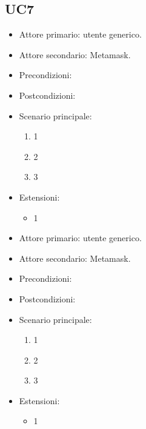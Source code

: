 \subsection{UC7}

\begin{itemize}
    \item Attore primario: utente generico.
    \item Attore secondario: Metamask.
    \item Precondizioni: 
    \item Postcondizioni: 
    \item Scenario principale: \begin{enumerate}
        \item 1
        \item 2
        \item 3
    \end{enumerate}
    \item Estensioni: \begin{itemize}
        \item 1
        \end{itemize}
\end{itemize}

\begin{itemize}
    \item Attore primario: utente generico.
    \item Attore secondario: Metamask.
    \item Precondizioni: 
    \item Postcondizioni: 
    \item Scenario principale: \begin{enumerate}
        \item 1
        \item 2
        \item 3
    \end{enumerate}
    \item Estensioni: \begin{itemize}
        \item 1
        \end{itemize}
\end{itemize}